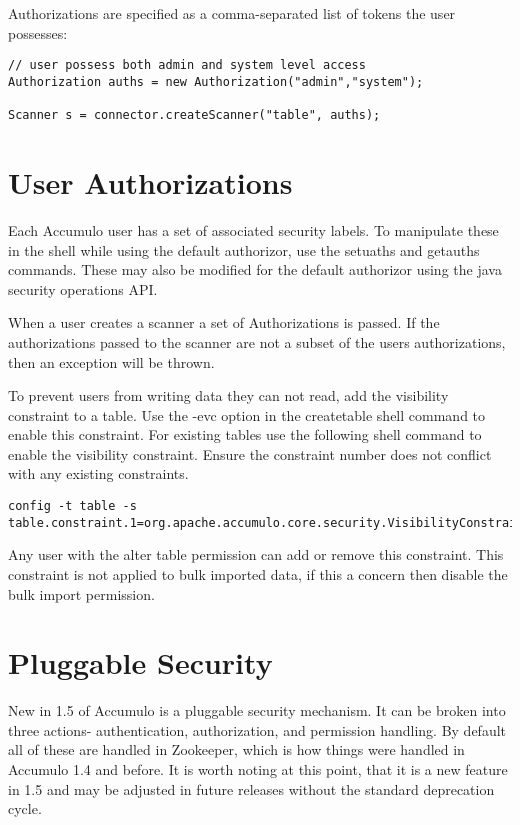 Authorizations are specified as a comma-separated list of tokens the user possesses:

\small
\begin{verbatim}
// user possess both admin and system level access
Authorization auths = new Authorization("admin","system");

Scanner s = connector.createScanner("table", auths);
\end{verbatim}
\normalsize

\section{User Authorizations}

Each Accumulo user has a set of associated security labels. To manipulate
these in the shell while using the default authorizor, use the setuaths and getauths commands.
These may also be modified for the default authorizor using the java security operations API. 

When a user creates a scanner a set of Authorizations is passed. If the
authorizations passed to the scanner are not a subset of the users
authorizations, then an exception will be thrown.

To prevent users from writing data they can not read, add the visibility
constraint to a table. Use the -evc option in the createtable shell command to
enable this constraint. For existing tables use the following shell command to
enable the visibility constraint. Ensure the constraint number does not
conflict with any existing constraints.
  
\small
\begin{verbatim}
config -t table -s table.constraint.1=org.apache.accumulo.core.security.VisibilityConstraint
\end{verbatim}
\normalsize

Any user with the alter table permission can add or remove this constraint.
This constraint is not applied to bulk imported data, if this a concern then
disable the bulk import permission.

\section{Pluggable Security}

New in 1.5 of Accumulo is a pluggable security mechanism. It can be broken into three actions-
authentication, authorization, and permission handling. By default all of these are handled in
Zookeeper, which is how things were handled in Accumulo 1.4 and before. It is worth noting at this
point, that it is a new feature in 1.5 and may be adjusted in future releases without the standard
deprecation cycle.

